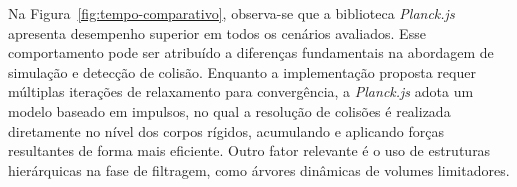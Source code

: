 Na Figura~\ref{fig:tempo-comparativo}, observa-se que a biblioteca \textit{Planck.js} apresenta desempenho superior em todos os cenários avaliados. Esse comportamento pode ser atribuído a diferenças fundamentais na abordagem de simulação e detecção de colisão. Enquanto a implementação proposta requer múltiplas iterações de relaxamento para convergência, a \textit{Planck.js} adota um modelo baseado em impulsos, no qual a resolução de colisões é realizada diretamente no nível dos corpos rígidos, acumulando e aplicando forças resultantes de forma mais eficiente. Outro fator relevante é o uso de estruturas hierárquicas na fase de filtragem, como árvores dinâmicas de volumes limitadores.
